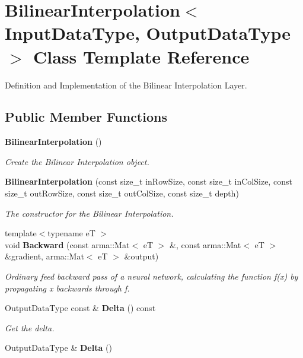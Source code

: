 \section{Bilinear\+Interpolation$<$ Input\+Data\+Type, Output\+Data\+Type $>$ Class Template Reference}
\label{classmlpack_1_1ann_1_1BilinearInterpolation}


Definition and Implementation of the Bilinear Interpolation Layer.  


\subsection*{Public Member Functions}
\begin{DoxyCompactItemize}
\item 
\textbf{ Bilinear\+Interpolation} ()
\begin{DoxyCompactList}\small\item\em Create the Bilinear Interpolation object. \end{DoxyCompactList}\item 
\textbf{ Bilinear\+Interpolation} (const size\+\_\+t in\+Row\+Size, const size\+\_\+t in\+Col\+Size, const size\+\_\+t out\+Row\+Size, const size\+\_\+t out\+Col\+Size, const size\+\_\+t depth)
\begin{DoxyCompactList}\small\item\em The constructor for the Bilinear Interpolation. \end{DoxyCompactList}\item 
{\footnotesize template$<$typename eT $>$ }\\void \textbf{ Backward} (const arma\+::\+Mat$<$ eT $>$ \&, const arma\+::\+Mat$<$ eT $>$ \&gradient, arma\+::\+Mat$<$ eT $>$ \&output)
\begin{DoxyCompactList}\small\item\em Ordinary feed backward pass of a neural network, calculating the function f(x) by propagating x backwards through f. \end{DoxyCompactList}\item 
Output\+Data\+Type const  \& \textbf{ Delta} () const
\begin{DoxyCompactList}\small\item\em Get the delta. \end{DoxyCompactList}\item 
Output\+Data\+Type \& \textbf{ Delta} ()

\end{DoxyCompactItemize}
